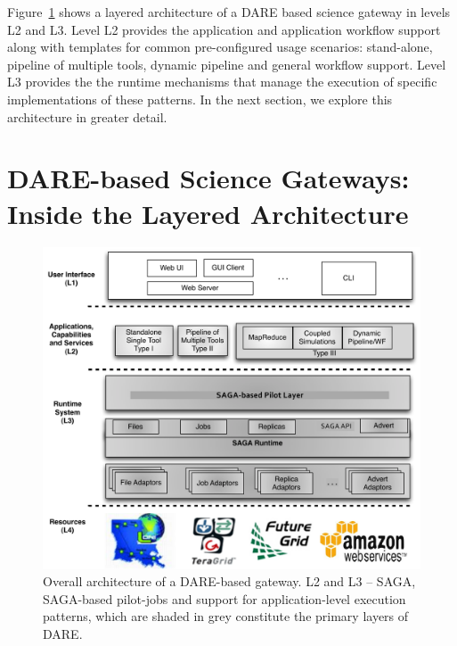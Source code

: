 \documentclass[]{svjour3}
\begin{document}
Figure~\ref{fig:dare-arch} shows a layered architecture of a DARE
based science gateway in levels L2 and L3. Level L2 provides the
application and application workflow support along with templates for
common pre-configured usage scenarios: stand-alone, pipeline of
multiple tools, dynamic pipeline and general workflow support. Level
L3 provides the the runtime mechanisms that manage the execution of
specific implementations of these patterns. In the next section, we
explore this architecture in greater detail.

\section{DARE-based Science Gateways: Inside the Layered Architecture}

\begin{figure}
 \centering
 \includegraphics[scale=0.55]{figures/dare-middleware-arch.pdf}
 \caption{\small Overall architecture of a DARE-based gateway. L2 and
   L3 -- SAGA, SAGA-based pilot-jobs and support for application-level
   execution patterns, which are shaded in grey constitute the primary
   layers of DARE.}
 \label{fig:dare-arch}
\end{figure}

\end{document}
